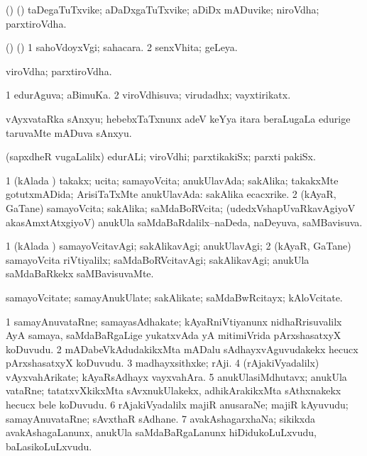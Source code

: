 \bentry
{}
\gl{\nA}
\bmng
(\veYshA) (\pArxparx) taDegaTuTxvike; aDaDxgaTuTxvike; aDiDx mADuvike; niroVdha; parxtiroVdha. 
\emng
\eentry

\bentry
{}
\gl{\nA}
\bmng
(\birx) (\AmA) 
\bnum
\num{1} sahoVdoyxVgi; sahacara. 
\num{2} senxVhita; geLeya. 
\enum
\emng
\eentry

\bentry
{}
\gl{\nA}
\bmng
viroVdha; parxtiroVdha. 
\emng
\eentry

\bentry
{}
\gl{\gu}
\bmng
\bnum
\num{1} edurAguva; aBimuKa. 
\num{2} viroVdhisuva; virudadhx; vayxtirikatx. 
\enum
\emng

\noindent
\gl{\pagu}
\bmng
{} vAyxvataRka sAnxyu; hebebxTaTxnunx adeV keYya itara beraLugaLa edurige taruvaMte mADuva sAnxyu. 
\emng
\eentry

\bentry
{}
\gl{\nA}
\bmng
(sapxdheR \mo vugaLalilx) edurALi; viroVdhi; parxtikakiSx; parxti pakiSx. 
\emng
\eentry

\bentry
{}
\gl{\gu}
\bmng
\bnum
\num{1} (kAlada \vi) takakx; ucita; samayoVcita; anukUlavAda; sakAlika; takakxMte gotutxmADida; ArisiTaTxMte anukUlavAda:  sakAlika ecacxrike. 
\num{2} (kAyaR, GaTane) samayoVcita; sakAlika; saMdaBoRVcita; (udedxVshapUvaRkavAgiyoV akasAmxtAtxgiyoV) anukUla saMdaBaRdalilx--naDeda, naDeyuva, saMBavisuva. 
\enum
\emng
\eentry

\bentry
{}
\gl{\kirxvi}
\bmng
\bnum
\num{1} (kAlada \vi) samayoVcitavAgi; sakAlikavAgi; anukUlavAgi; 
\num{2} (kAyaR, GaTane) samayoVcita riVtiyalilx; saMdaBoRVcitavAgi; sakAlikavAgi; anukUla saMdaBaRkekx saMBavisuvaMte. 
\enum
\emng
\eentry

\bentry
{}
\gl{\nA}
\bmng
samayoVcitate; samayAnukUlate; sakAlikate; saMdaBwRcitayx; kAloVcitate. 
\emng
\eentry

\bentry
{}
\gl{\nA}
\bmng
\bnum
\num{1} samayAnuvataRne; samayasAdhakate; kAyaRniVtiyanunx nidhaRrisuvalilx AyA samaya, saMdaBaRgaLige yukatxvAda yA mitimiVrida pArxshasatxyX koDuvudu. 
\num{2} mADabeVkAdudakikxMta mADalu sAdhayxvAguvudakekx hecucx pArxshasatxyX koDuvudu. 
\num{3} madhayxsithxke; rAji. 
\num{4} (rAjakiVyadalilx) vAyxvahArikate; kAyaRsAdhayx vayxvahAra. 
\num{5} anukUlasiMdhutavx; anukUla vataRne; tatatxvXkikxMta sAvxnukUlakekx, adhikArakikxMta sAthxnakekx hecucx bele koDuvudu. 
\num{6} rAjakiVyadalilx majiR anusaraNe; majiR kAyuvudu; samayAnuvataRne; sAvxthaR sAdhane. 
\num{7} avakAshagarxhaNa; sikikxda avakAshagaLanunx, anukUla saMdaBaRgaLanunx hiDidukoLuLxvudu, baLasikoLuLxvudu. 
\enum
\emng
\eentry

